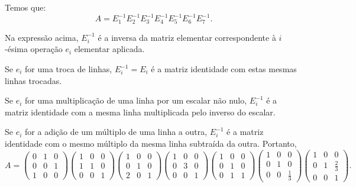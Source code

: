 \begin{example}
    Temos que:
    \begin{equation*}
        A = E_1^{-1} E_2^{-1} E_3^{-1} E_4^{-1} E_5^{-1} E_6^{-1} E_7^{-1}.
    \end{equation*}

    Na expressão acima, $E_i^{-1}$ é a inversa da matriz elementar correspondente à $i$-ésima operação $e_i$ elementar aplicada.

    Se $e_i$ for uma troca de linhas, $E_i^{-1}=E_i$ é a matriz identidade com estas mesmas linhas trocadas.

    Se $e_i$ for uma multiplicação de uma linha por um escalar não nulo, $E_i^{-1}$ é a matriz identidade com a mesma linha multiplicada pelo inverso do escalar.
    
    Se $e_i$ for a adição de um múltiplo de uma linha a outra, $E_i^{-1}$ é a matriz identidade com o mesmo múltiplo da mesma linha subtraída da outra.
    Portanto,
    \begin{equation*}
        A = \begin{pmatrix}
            0 & 1 & 0 \\
            0 & 0 & 1 \\
            1 & 0 & 0
        \end{pmatrix}
        \begin{pmatrix}
            1 & 0 & 0 \\
            1 & 1 & 0 \\
            0 & 0 & 1
        \end{pmatrix}
        \begin{pmatrix}
            1 & 0 & 0 \\
            0 & 1 & 0 \\
            2 & 0 & 1
        \end{pmatrix}
        \begin{pmatrix}
            1 & 0 & 0 \\
            0 & 3 & 0 \\
            0 & 0 & 1
        \end{pmatrix}
        \begin{pmatrix}
            1 & 0 & 0 \\
            0 & 1 & 0 \\
            0 & 1 & 1
        \end{pmatrix}
        \begin{pmatrix}
            1 & 0 & 0 \\
            0 & 1 & 0 \\
            0 & 0 & \frac{1}{3}
        \end{pmatrix}
        \begin{pmatrix}
            1 & 0 & 0 \\
            0 & 1 & \frac{2}{3} \\
            0 & 0 & 1
        \end{pmatrix}.
    \end{equation*}
\end{example}